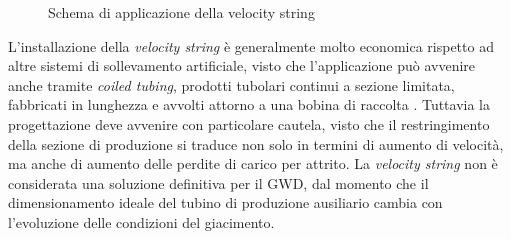 \begin{figure}[htbp]
\centering
     \quad
    \caption{Schema di applicazione della velocity string \parencite{arachman2004liquid}} 
    \label{fig:velocitystring}
\end{figure}

L'installazione della \textit{velocity string} è generalmente molto economica rispetto ad altre sistemi di sollevamento artificiale, visto che l'applicazione può avvenire anche tramite \textit{coiled tubing}, prodotti tubolari continui a sezione limitata, fabbricati in lunghezza e avvolti attorno a una bobina di raccolta \parencite{international2014introduction}. Tuttavia la progettazione deve avvenire con particolare cautela, visto che il restringimento della sezione di produzione si traduce non solo in termini di aumento di velocità, ma anche di aumento delle perdite di carico per attrito. La \textit{velocity string} non è considerata una soluzione definitiva per il GWD, dal momento che il dimensionamento ideale del tubino di produzione ausiliario cambia con l'evoluzione delle condizioni del giacimento.

